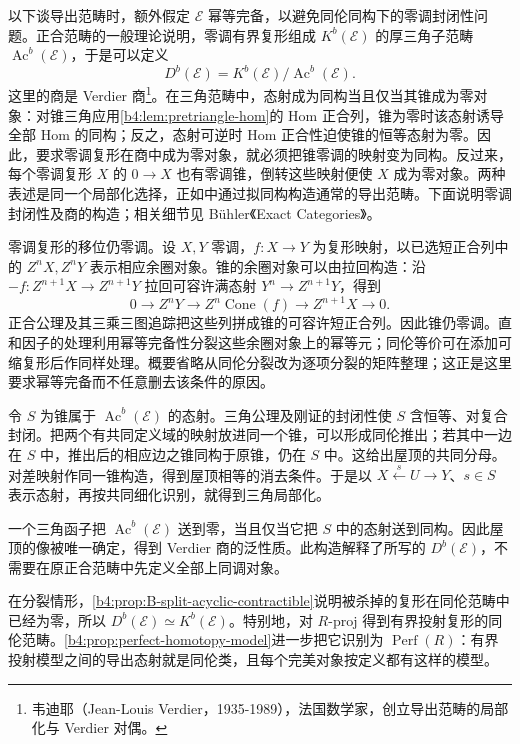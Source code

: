 以下谈导出范畴时，额外假定 \(\mathcal E\) 幂等完备，以避免同伦同构下的零调封闭性问题。正合范畴的一般理论说明，零调有界复形组成 \(K^b(\mathcal E)\) 的厚三角子范畴 \(\operatorname{Ac}^b(\mathcal E)\)，于是可以定义
\[
	D^b(\mathcal E) =K^b(\mathcal E)/\operatorname{Ac}^b(\mathcal E).
\]
这里的商是 Verdier 商\footnote{韦迪耶（Jean-Louis Verdier，1935-1989），法国数学家，创立导出范畴的局部化与 Verdier 对偶。}。在三角范畴中，态射成为同构当且仅当其锥成为零对象：对锥三角应用\cref{b4:lem:pretriangle-hom}的 Hom 正合列，锥为零时该态射诱导全部 Hom 的同构；反之，态射可逆时 Hom 正合性迫使锥的恒等态射为零。因此，要求零调复形在商中成为零对象，就必须把锥零调的映射变为同构。反过来，每个零调复形 \(X\) 的 \(0\to X\) 也有零调锥，倒转这些映射便使 \(X\) 成为零对象。两种表述是同一个局部化选择，正如中通过拟同构构造通常的导出范畴。下面说明零调封闭性及商的构造；相关细节见 Bühler《Exact Categories》\cite[Definition 10.1, Proposition 10.14; Section 10.4]{Buehler2010ExactCategories}。
\begin{proofsketch}
	零调复形的移位仍零调。设 \(X,Y\) 零调，\(f:X\to Y\) 为复形映射，以已选短正合列中的 \(Z^nX,Z^nY\) 表示相应余圈对象。锥的余圈对象可以由拉回构造：沿 \(-f:Z^{n+1}X\to Z^{n+1}Y\) 拉回可容许满态射 \(Y^n\to Z^{n+1}Y\)，得到
	\[
		0\to Z^nY\to Z^n\operatorname{Cone}(f) \to Z^{n+1}X\to0.
	\]
	正合公理及其三乘三图追踪把这些列拼成锥的可容许短正合列。因此锥仍零调。直和因子的处理利用幂等完备性分裂这些余圈对象上的幂等元；同伦等价可在添加可缩复形后作同样处理。概要省略从同伦分裂改为逐项分裂的矩阵整理；这正是这里要求幂等完备而不任意删去该条件的原因。

	令 \(S\) 为锥属于 \(\operatorname{Ac}^b(\mathcal E)\) 的态射。三角公理及刚证的封闭性使 \(S\) 含恒等、对复合封闭。把两个有共同定义域的映射放进同一个锥，可以形成同伦推出；若其中一边在 \(S\) 中，推出后的相应边之锥同构于原锥，仍在 \(S\) 中。这给出屋顶的共同分母。对差映射作同一锥构造，得到屋顶相等的消去条件。于是以 \(X\xleftarrow{s}U\to Y\)、\(s\in S\) 表示态射，再按共同细化识别，就得到三角局部化。

	一个三角函子把 \(\operatorname{Ac}^b(\mathcal E)\) 送到零，当且仅当它把 \(S\) 中的态射送到同构。因此屋顶的像被唯一确定，得到 Verdier 商的泛性质。此构造解释了所写的 \(D^b(\mathcal E)\)，不需要在原正合范畴中先定义全部上同调对象。
\end{proofsketch}

在分裂情形，\cref{b4:prop:B-split-acyclic-contractible}说明被杀掉的复形在同伦范畴中已经为零，所以 \(D^b(\mathcal E)\simeq K^b(\mathcal E)\)。特别地，对 \(R\text{-}\mathrm{proj}\) 得到有界投射复形的同伦范畴。\cref{b4:prop:perfect-homotopy-model}进一步把它识别为 \(\operatorname{Perf}(R)\)：有界投射模型之间的导出态射就是同伦类，且每个完美对象按定义都有这样的模型。


